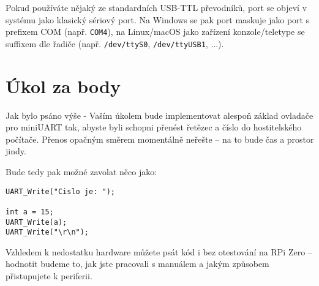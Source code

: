 \documentclass{article}
\begin{document}
Pokud používáte nějaký ze standardních USB-TTL převodníků, port se objeví v systému jako klasický sériový port. Na Windows se pak port maskuje jako port s prefixem COM (např. \texttt{COM4}), na Linux/macOS jako zařízení konzole/teletype se suffixem dle řadiče (např. \texttt{/dev/ttyS0}, \texttt{/dev/ttyUSB1}, ...).

\section{Úkol za body}

Jak bylo psáno výše - Vaším úkolem bude implementovat alespoň základ ovladače pro miniUART tak, abyste byli schopni přenést řetězec a číslo do hostitelského počítače. Přenos opačným směrem momentálně neřešte -- na to bude čas a prostor jindy.

Bude tedy pak možné zavolat něco jako:

\begin{lstlisting}
UART_Write("Cislo je: ");

int a = 15;
UART_Write(a);
UART_Write("\r\n");
\end{lstlisting}

Vzhledem k nedostatku hardware můžete psát kód i bez otestování na RPi Zero -- hodnotit budeme to, jak jste pracovali s manuálem a jakým způsobem přistupujete k periferii.
\end{document}
